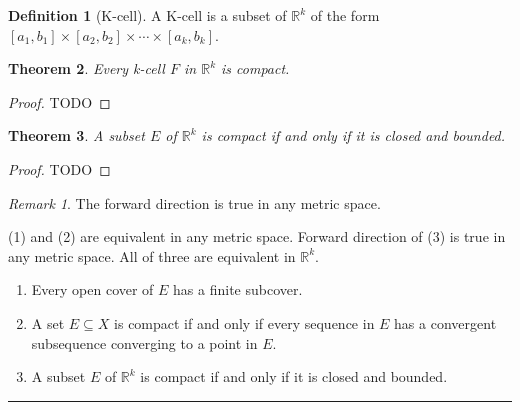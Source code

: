 \documentclass[12pt, lettersize]{article}
\theoremstyle{plain}
\newtheorem{thm}{Theorem}[section]
\theoremstyle{definition}
\newtheorem{dfn}[thm]{Definition}
\theoremstyle{remark}
\newtheorem*{rem}{Remark}
\newcommand{\R}{\mathbb{R}}
\newcommand{\lline}{\noindent\rule{\textwidth}{1pt}}
\begin{document}
\begin{dfn}[K-cell]
	A K-cell is a subset of $\R^k$ of the form $[a_1,b_1]\times[a_2,b_2]\times\cdots\times[a_k,b_k]$.
\end{dfn}

\begin{thm}
	Every k-cell $F$ in $\mathbb{R}^k$ is compact.
\end{thm}
\begin{proof}
	TODO
\end{proof}

\begin{thm}
	A subset $E$ of $\mathbb{R}^k$ is compact if and only if it is closed and bounded.
\end{thm}
\begin{proof}
	TODO
\end{proof}
\begin{rem}
	The forward direction is true in any metric space.
\end{rem}

\begin{tcolorbox}[title=\textbf{Characterization of compact sets}]
	(1) and (2) are equivalent in any metric space. Forward direction of (3) is true in any metric space. All of three are equivalent in $\R^k$.
	\begin{enumerate}
		\item Every open cover of $E$ has a finite subcover.
		\item A set $E\subseteq X$ is compact if and only if every sequence in $E$ has a convergent subsequence converging to a point in $E$.
		\item A subset $E$ of $\mathbb{R}^k$ is compact if and only if it is closed and bounded.
	\end{enumerate}
\end{tcolorbox}
\lline
\end{document}
